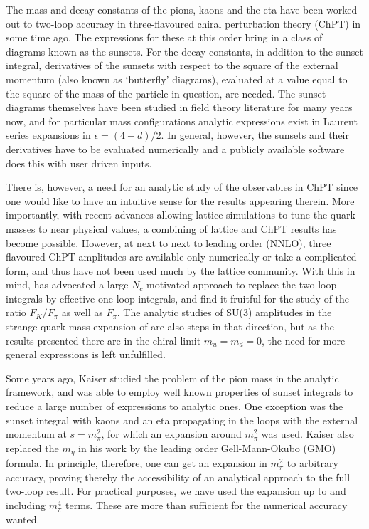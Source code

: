 \documentclass[12pt,a4paper]{article}
\begin{document}
The mass and decay constants of the pions, kaons and the eta have been worked out to two-loop accuracy in three-flavoured chiral perturbation theory (ChPT) in \cite{Amoros:1999dp} some time ago. The expressions for these at this order bring in a class of diagrams known as the sunsets. For the decay constants, in addition to the sunset integral, derivatives of the sunsets with respect to the square of the external momentum (also known as `butterfly' diagrams), evaluated at a value equal to the square of the mass of the particle in question, are needed. The sunset diagrams themselves have been studied in field theory literature for many years now, and for particular mass configurations analytic expressions exist in Laurent series expansions in $\epsilon = (4-d)/2$. In general, however, the sunsets and their derivatives have to be evaluated numerically and a publicly available software \cite{Bijnens:2014gsa} does this with user driven inputs.

There is, however, a need for an analytic study of the observables in ChPT since one would like to have an intuitive sense for the results appearing therein. More importantly, with recent advances allowing lattice simulations to tune the quark masses to near physical values, a combining of lattice and ChPT results has become possible. However, at next to next to leading order (NNLO), three flavoured ChPT amplitudes are available only numerically or take a complicated form, and thus have not been used much by the lattice community. With this in mind, \cite{Ecker:2010nc,Ecker:2013pba} has advocated a large $N_c$ motivated approach to replace the two-loop integrals by effective one-loop integrals, and find it fruitful for the study of the ratio $F_K/F_\pi$ as well as $F_\pi$. The analytic studies of SU(3) amplitudes in the strange quark mass expansion of \cite{Gasser:2007sg, Gasser:2009hr, Gasser:2010zz} are also steps in that direction, but as the results presented there are in the chiral limit $m_u=m_d=0$, the need for more general expressions is left unfulfilled.

Some years ago, Kaiser \cite{Kaiser:2007kf} studied the problem of the pion mass in the analytic framework, and was able to employ well known properties of sunset integrals to reduce a large number of expressions to analytic ones. One exception was the sunset integral with kaons and an eta propagating in the loops with the external momentum at $s=m_\pi^2$, for which an expansion around $m_\pi^2$ was used. Kaiser \cite{Kaiser:2007kf} also replaced the $m_\eta$ in his work by the leading order Gell-Mann-Okubo (GMO) formula. In principle, therefore, one can get an expansion in $m_{\pi}^2$ to arbitrary accuracy, proving thereby the accessibility of an analytical approach to the full two-loop result. For practical purposes, we have used the expansion up to and including $m_\pi^4$ terms. These are more than sufficient for the numerical accuracy wanted.
\end{document}
